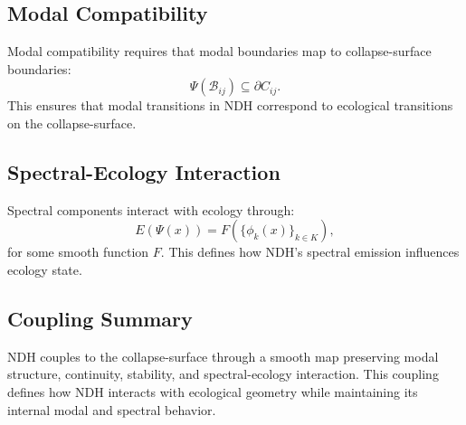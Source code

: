\subsection{Modal Compatibility}

Modal compatibility requires that modal boundaries map to collapse-surface
boundaries:
\[
\Psi(\mathcal{B}_{ij}) \subseteq \partial C_{ij}.
\]
This ensures that modal transitions in NDH correspond to ecological transitions
on the collapse-surface.

\subsection{Spectral-Ecology Interaction}

Spectral components interact with ecology through:
\[
E(\Psi(x)) = F(\{\phi_k(x)\}_{k \in K}),
\]
for some smooth function $F$. This defines how NDH's spectral emission influences
ecology state.

\subsection{Coupling Summary}

NDH couples to the collapse-surface through a smooth map preserving modal
structure, continuity, stability, and spectral-ecology interaction. This coupling
defines how NDH interacts with ecological geometry while maintaining its internal
modal and spectral behavior.
